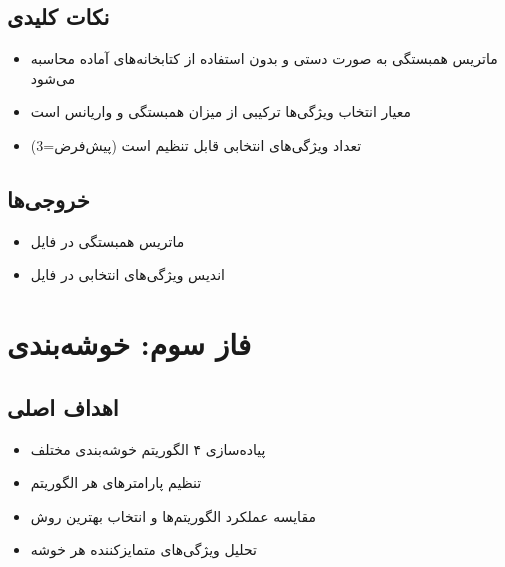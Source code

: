\documentclass[a4paper,12pt]{article}
\let\nobreaksection\section
\renewcommand{\section}{\nobreaksection}  %
\begin{document}
	\subsection{نکات کلیدی}
	\begin{itemize}
		\item ماتریس همبستگی به صورت دستی و بدون استفاده از کتابخانه‌های آماده محاسبه می‌شود
		\item معیار انتخاب ویژگی‌ها ترکیبی از میزان همبستگی و واریانس است
		\item تعداد ویژگی‌های انتخابی قابل تنظیم است (پیش‌فرض=3)
	\end{itemize}
	
	\subsection{خروجی‌ها}
	\begin{itemize}
		\item ماتریس همبستگی در فایل 
		\item اندیس ویژگی‌های انتخابی در فایل 
	\end{itemize}
	
	
	\section{فاز سوم: خوشه‌بندی}
	
	\subsection{اهداف اصلی}
	\begin{itemize}
		\item پیاده‌سازی ۴ الگوریتم خوشه‌بندی مختلف
		\item تنظیم پارامترهای هر الگوریتم
		\item مقایسه عملکرد الگوریتم‌ها و انتخاب بهترین روش
		\item تحلیل ویژگی‌های متمایزکننده هر خوشه
	\end{itemize}
	
\end{document}
